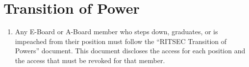 
\section{Transition of Power}

\begin{enumerate}
  \item Any E-Board or A-Board member who steps down, graduates, or is
    impeached from their position must follow the “RITSEC Transition of Powers”
    document. This document discloses the access for each position and the
    access that must be revoked for that member. 
\end{enumerate}